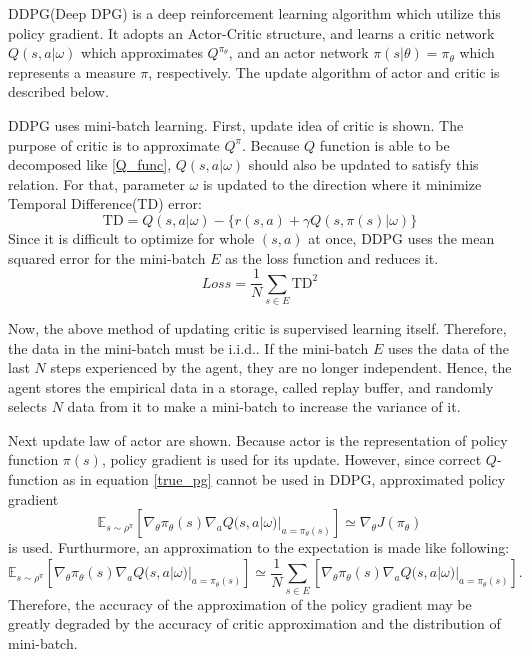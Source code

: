 \documentclass[english, dvipdfmx]{ampmt}             %
\newcommand{\expect}{\mathbb{E}}
\begin{document}
DDPG(Deep DPG) is a deep reinforcement learning algorithm which utilize this policy gradient. It adopts an Actor-Critic structure, and learns a critic network $Q(s,a|\omega)$ which approximates $Q^{\pi_{\theta}}$, and an actor network $\pi(s|\theta)=\pi_{\theta}$ which represents a measure $\pi$, respectively. The update algorithm of actor and critic is described below.\par
DDPG uses mini-batch learning. First, update idea of critic is shown. The purpose of critic is to approximate $Q^{\pi}$. Because $Q$ function is able to be decomposed like \eqref{Q_func}, $Q(s,a|\omega)$ should also be updated to satisfy this relation. For that, parameter $\omega$ is updated to the direction where it minimize Temporal Difference(TD) error: 
\begin{equation}
	\textrm{TD} = Q(s,a|\omega) - \{r(s,a)+\gamma Q(s,\pi(s)|\omega)\}
\end{equation}
Since it is difficult to optimize for whole $(s,a)$ at once, DDPG uses the mean squared error for the mini-batch $E$ as the loss function and reduces it. 
\begin{equation}
	Loss = \frac{1}{N}\sum_{s\in E} \textrm{TD}^2
\end{equation}\par
Now, the above method of updating critic is supervised learning itself. Therefore, the data in the mini-batch must be i.i.d.. If the mini-batch $E$ uses the data of the last $N$ steps experienced by the agent, they are no longer independent. Hence, the agent stores the empirical data in a storage, called replay buffer, and randomly selects $N$ data from it to make a mini-batch to increase the variance of it.\par
Next update law of actor are shown. Because actor is the representation of policy function $\pi(s)$, policy gradient is used for its update. However, since correct $Q$-function as in equation \eqref{true_pg} cannot be used in DDPG, approximated policy gradient
\begin{equation}
	\expect_{s\sim\rho^{\pi}}[\nabla_{\theta}\pi_{\theta}(s)\nabla_{a}Q(s, a|\omega)|_{a=\pi_{\theta}(s)}] \simeq \nabla_{\theta}J(\pi_{\theta}) 
\end{equation}
 is used. Furthurmore, an approximation to the expectation is made like following:
 \begin{equation}
	\expect_{s\sim\rho^{\pi}}[\nabla_{\theta}\pi_{\theta}(s)\nabla_{a}Q(s, a|\omega)|_{a=\pi_{\theta}(s)}] \simeq \frac{1}{N}\sum_{s\in E}[\nabla_{\theta}\pi_{\theta}(s)\nabla_{a}Q(s, a|\omega)|_{a=\pi_{\theta}(s)}]. \label{expectation_approximation}
\end{equation}
Therefore, the accuracy of the approximation of the policy gradient may be greatly degraded by the accuracy of critic approximation and the distribution of mini-batch.
\end{document}
